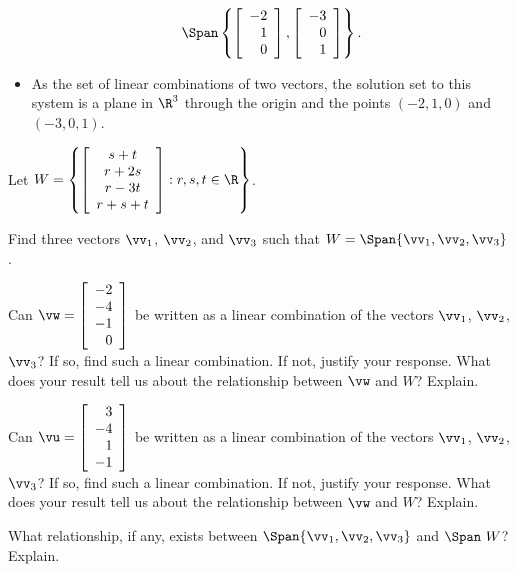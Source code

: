\begin{example}
\begin{itemize}
	\[\Span\left\{\left[ \begin{array}{r} -2\\1\\0 \end{array} \right], \left[ \begin{array}{r} -3\\0\\1 \end{array} \right] \right\}.\] 
	\item As the set of linear combinations of two vectors, the solution set to this system is a plane in $\R^3$  through the origin and the points $(-2,1,0)$ and $(-3,0,1)$. 
	\end{itemize} 
\ea
\end{example}

\begin{example} \label{example:1_d_span} Let $W = \left\{\left[ \begin{array}{c} s+t \\ r+2s \\ r-3t \\ r+s+t \end{array} \right] : r,s,t \in \R \right\}$. 
	\ba
	\item Find three vectors $\vv_1$, $\vv_2$, and $\vv_3$ such that $W = \Span\{\vv_1, \vv_2, \vv_3\}$. 
	\item Can $\vw = \left[ \begin{array}{r} -2\\-4\\-1\\0 \end{array} \right]$ be written as a linear combination of the vectors $\vv_1$, $\vv_2$, $\vv_3$? If so, find such a linear combination. If not, justify your response. What does your result tell us about the relationship between $\vw$ and $W$? Explain. 
	\item  Can $\vu = \left[ \begin{array}{r} 3\\-4\\1\\-1 \end{array} \right]$ be written as a linear combination of the vectors $\vv_1$, $\vv_2$, $\vv_3$? If so, find such a linear combination. If not, justify your response. What does your result tell us about the relationship between $\vw$ and $W$? Explain.
	\item What relationship, if any, exists between $\Span\{\vv_1, \vv_2, \vv_3\}$ and $\Span \ W$? Explain. 
	\ea


\end{example}
